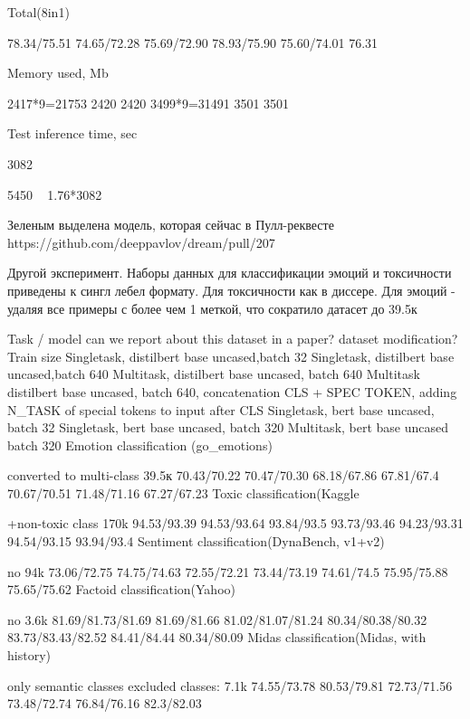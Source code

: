 Total(8in1)


78.34/75.51
74.65/72.28
75.69/72.90
78.93/75.90
75.60/74.01
76.31


Memory used, Mb


2417*9=21753
2420
2420
3499*9=31491
3501
3501


Test inference time, sec




3082




5450  ~ 1.76*3082








Зеленым выделена модель, которая сейчас в Пулл-реквесте https://github.com/deeppavlov/dream/pull/207

Другой эксперимент. Наборы данных для классификации эмоций и токсичности приведены к сингл лебел формату. Для токсичности как в диссере. Для эмоций - удаляя все примеры с более чем 1 меткой, что сократило датасет до 39.5к




Task / model
can we report about this dataset in a paper?
dataset modification?
Train size
Singletask, distilbert base uncased,batch 32
Singletask, distilbert base uncased,batch 640
Multitask, distilbert base uncased, batch 640
Multitask distilbert base uncased, batch 640, concatenation 
CLS + SPEC TOKEN,
adding N_TASK of special tokens to input after CLS
Singletask, bert base uncased, batch 32
Singletask, bert base uncased, batch 320
Multitask, bert base uncased
batch 320
Emotion classification (go_emotions)




converted to multi-class
39.5к
70.43/70.22
70.47/70.30
68.18/67.86
67.81/67.4
70.67/70.51
71.48/71.16
67.27/67.23
Toxic classification(Kaggle


+non-toxic class
170k
94.53/93.39
94.53/93.64
93.84/93.5
93.73/93.46
94.23/93.31
94.54/93.15
93.94/93.4
Sentiment classification(DynaBench, v1+v2)


no
94k
73.06/72.75
74.75/74.63
72.55/72.21
73.44/73.19
74.61/74.5
75.95/75.88
75.65/75.62
Factoid classification(Yahoo)


no
3.6k
81.69/81.73/81.69
81.69/81.66
81.02/81.07/81.24
80.34/80.38/80.32
83.73/83.43/82.52
84.41/84.44
80.34/80.09
Midas classification(Midas, with history)


only semantic classes
excluded classes: 
7.1k
74.55/73.78
80.53/79.81
72.73/71.56
73.48/72.74
76.84/76.16
82.3/82.03


